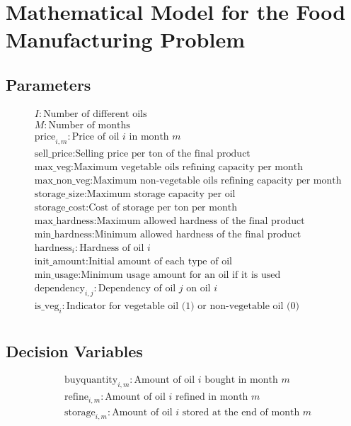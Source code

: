 \documentclass{article}
\begin{document}
\section*{Mathematical Model for the Food Manufacturing Problem}

\subsection*{Parameters}
\begin{align*}
& I: \text{Number of different oils} \\
& M: \text{Number of months} \\
& \text{price}_{i,m}: \text{Price of oil } i \text{ in month } m \\
& \text{sell\_price}: \text{Selling price per ton of the final product} \\
& \text{max\_veg}: \text{Maximum vegetable oils refining capacity per month} \\
& \text{max\_non\_veg}: \text{Maximum non-vegetable oils refining capacity per month} \\
& \text{storage\_size}: \text{Maximum storage capacity per oil} \\
& \text{storage\_cost}: \text{Cost of storage per ton per month} \\
& \text{max\_hardness}: \text{Maximum allowed hardness of the final product} \\
& \text{min\_hardness}: \text{Minimum allowed hardness of the final product} \\
& \text{hardness}_{i}: \text{Hardness of oil } i \\
& \text{init\_amount}: \text{Initial amount of each type of oil} \\
& \text{min\_usage}: \text{Minimum usage amount for an oil if it is used} \\
& \text{dependency}_{i,j}: \text{Dependency of oil } j \text{ on oil } i \\
& \text{is\_veg}_{i}: \text{Indicator for vegetable oil (1) or non-vegetable oil (0)} \\
\end{align*}

\subsection*{Decision Variables}
\begin{align*}
& \text{buyquantity}_{i,m}: \text{Amount of oil } i \text{ bought in month } m \\
& \text{refine}_{i,m}: \text{Amount of oil } i \text{ refined in month } m \\
& \text{storage}_{i,m}: \text{Amount of oil } i \text{ stored at the end of month } m \\
\end{align*}
\end{document}
